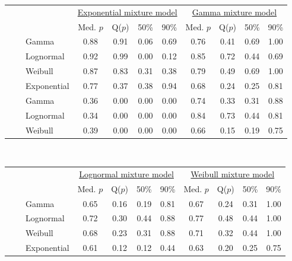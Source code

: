 \documentclass[useAMS,usenatbib,referee,12pt]{article}
\begin{document}
\begin{table}[ht]
\footnotesize\centering
\begin{tabular}{l|l|l|cccc|cccc}
 \multicolumn{3}{c}{ } & \multicolumn{4}{c}{\underline{Exponential mixture model}} & \multicolumn{4}{c}{\underline{Gamma mixture model}} \\
 \multicolumn{3}{c}{ } & Med. $p$ & Q($p$) & 50\% & 90\%  & Med. $p$ & Q($p$) & 50\% & 90\% \\ 
  \hline
\parbox[t]{2mm}{} & \parbox[t]{2mm}{} & Gamma & 0.88 & 0.91 & 0.06 & 0.69 & 0.76 & 0.41 & 0.69 & 1.00 \\ 
& &   Lognormal & 0.92 & 0.99 & 0.00 & 0.12 & 0.85 & 0.72 & 0.44 & 0.69 \\ 
& &   Weibull & 0.87 & 0.83 & 0.31 & 0.38 & 0.79 & 0.49 & 0.69 & 1.00 \\ 
& &   Exponential & 0.77 & 0.37 & 0.38 & 0.94 & 0.68 & 0.24 & 0.25 & 0.81 \\ 
& \parbox[t]{2mm}{} & Gamma & 0.36 & 0.00 & 0.00 & 0.00 & 0.74 & 0.33 & 0.31 & 0.88 \\ 
& &   Lognormal & 0.34 & 0.00 & 0.00 & 0.00 & 0.84 & 0.73 & 0.44 & 0.81 \\ 
& &   Weibull & 0.39 & 0.00 & 0.00 & 0.00 & 0.66 & 0.15 & 0.19 & 0.75 \\
   \hline
\end{tabular}
\vspace{0.5cm}\\
\begin{tabular}{l|l|l|cccc|cccc}
 \multicolumn{3}{c}{ } & \multicolumn{4}{c}{\underline{Lognormal mixture model}} & \multicolumn{4}{c}{\underline{Weibull mixture model}} \\
 \multicolumn{3}{c}{ } & Med. $p$ & Q($p$) & 50\% & 90\% & Med. $p$ & Q($p$) & 50\% & 90\% \\ 
  \hline
\parbox[t]{2mm}{} & \parbox[t]{2mm}{} & Gamma & 0.65 & 0.16 & 0.19 & 0.81 & 0.67 & 0.24 & 0.31 & 1.00 \\ 
& &   Lognormal & 0.72 & 0.30 & 0.44 & 0.88 & 0.77 & 0.48 & 0.44 & 1.00 \\ 
& &   Weibull & 0.68 & 0.23 & 0.31 & 0.88 & 0.71 & 0.32 & 0.44 & 1.00 \\ 
& &   Exponential & 0.61 & 0.12 & 0.12 & 0.44 & 0.63 & 0.20 & 0.25 & 0.75 \\ 

\end{tabular}
\end{table}
\end{document}
